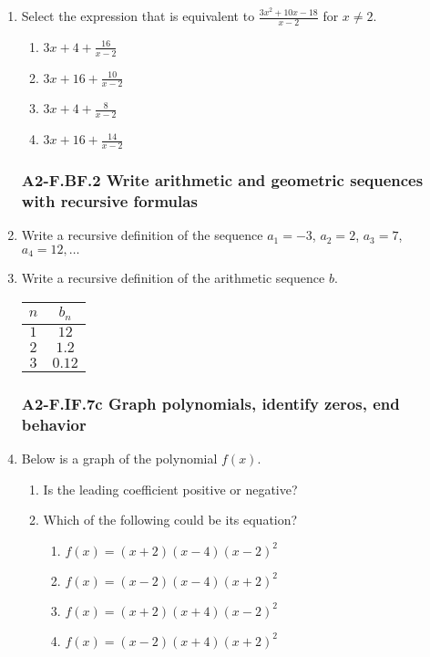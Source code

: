 \documentclass[12pt, twoside]{article}
\begin{document}
\begin{enumerate}[itemsep=0.5cm]
\item Select the expression that is equivalent to $\displaystyle \frac{3x^2 + 10x - 18}{x - 2}$ for $x \neq 2$.
    \begin{enumerate}
        \item $\displaystyle 3x + 4 + \frac{16}{x - 2}$
        \item $\displaystyle 3x + 16 + \frac{10}{x - 2}$
        \item $\displaystyle 3x + 4 + \frac{8}{x - 2}$
        \item $\displaystyle 3x + 16 + \frac{14}{x - 2}$
    \end{enumerate}
    \vspace{3cm}

\newpage
\subsubsection*{A2-F.BF.2 Write arithmetic and geometric sequences with recursive formulas}
\item Write a recursive definition of the sequence $a_1 = -3$, $a_2 = 2$, $a_3 = 7$, $a_4 = 12, \ldots$ \vspace{2cm}

\item Write a recursive definition of the arithmetic sequence $b$. \\[0.5cm]
\renewcommand{\arraystretch}{1.5}
\begin{tabular}{|c|c|}
\hline
$n$ & $b_n$ \\
\hline
$1$ & $12$ \\
$2$ & $1.2$ \\
$3$ & $0.12$ \\
\hline
\end{tabular} \vspace{1cm}

\newpage 
\subsubsection*{A2-F.IF.7c Graph polynomials, identify zeros, end behavior}
\item Below is a graph of the polynomial $f(x)$. 
\begin{multicols}{2}
    \begin{enumerate}[itemsep=1cm]
        \item Is the leading coefficient positive or negative?
        \item Which of the following could be its equation?
    \begin{enumerate}
        \item $f(x)=(x+2)(x-4)(x-2)^2$
        \item $f(x)=(x-2)(x-4)(x+2)^2$
        \item $f(x)=(x+2)(x+4)(x-2)^2$
        \item $f(x)=(x-2)(x+4)(x+2)^2$
    \end{enumerate} \vspace{1cm} \;
    \end{enumerate}


\end{multicols}
\end{enumerate}
\end{document}
